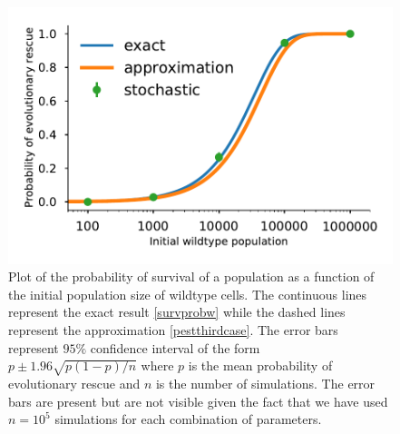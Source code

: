\documentclass[12pt]{extarticle}
\begin{document}
\begin{figure}[!t]
 \vspace*{1\baselineskip}
\includegraphics[width=1\textwidth]{Figures/DeleteriousTauLeapPlot.pdf}
\caption{Plot of the probability of survival of a population as a function of the initial population size of wildtype cells. The continuous lines represent the exact result \eqref{survprobw} while the dashed lines represent the approximation \eqref{pestthirdcase}. The error bars represent $95\%$ confidence interval of the form $p\pm1.96\sqrt{p\left(1-p\right)/n}$ where $p$ is the mean probability of evolutionary rescue and $n$ is the number of simulations. The error bars are present but are not visible given the fact that we have used $n=10^5$ simulations for each combination of parameters.}
\label{DeleteriousPlot}
\end{figure}

\end{document}
